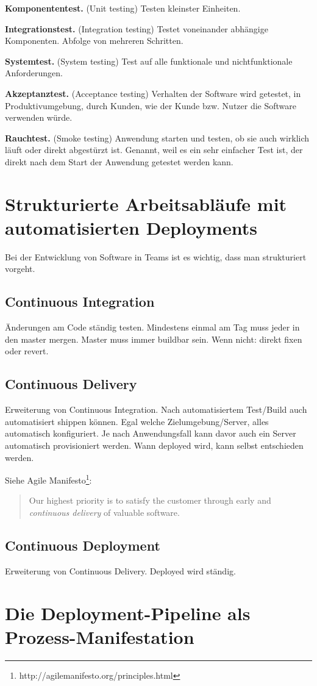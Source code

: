 \textbf{Komponententest.} (Unit testing) Testen kleinster Einheiten.

\textbf{Integrationstest.} (Integration testing) Testet voneinander abhängige Komponenten. Abfolge von mehreren Schritten.

\textbf{Systemtest.} (System testing) Test auf alle funktionale und nichtfunktionale Anforderungen.

\textbf{Akzeptanztest.} (Acceptance testing) Verhalten der Software wird getestet, in Produktivumgebung, durch Kunden, wie der Kunde bzw. Nutzer die Software verwenden würde.

\textbf{Rauchtest.} (Smoke testing) Anwendung starten und testen, ob sie auch wirklich läuft oder direkt abgestürzt ist. Genannt, weil es ein sehr einfacher Test ist, der direkt nach dem Start der Anwendung getestet werden kann.


\section{Strukturierte Arbeitsabläufe mit automatisierten Deployments}

Bei der Entwicklung von Software in Teams ist es wichtig, dass man strukturiert vorgeht.

\subsection{Continuous Integration}

Änderungen am Code ständig testen. Mindestens einmal am Tag muss jeder in den master mergen. Master muss immer buildbar sein. Wenn nicht: direkt fixen oder revert.

\subsection{Continuous Delivery}

Erweiterung von Continuous Integration. Nach automatisiertem Test/Build auch automatisiert shippen können. Egal welche Zielumgebung/Server, alles automatisch konfiguriert. Je nach Anwendungsfall kann davor auch ein Server automatisch provisioniert werden. Wann deployed wird, kann selbst entschieden werden.

Siehe Agile Manifesto\footnote{http://agilemanifesto.org/principles.html}:

\begin{quote}
  Our highest priority is to satisfy the customer through early and \emph{continuous delivery} of valuable software.
\end{quote}


\subsection{Continuous Deployment}

Erweiterung von Continuous Delivery. Deployed wird ständig.


\section{Die Deployment-Pipeline als Prozess-Manifestation}
